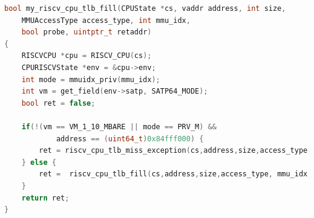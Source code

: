 \begin{lstlisting}[language=c,float=h!,basicstyle=\footnotesize,
    caption={Alternative Implementation for the RISC-V tlb\_fill function with a special case to
    start testing TLB miss Handler implementations.
    In line 11, a conditional branch is used to only trigger the exception when neither the
    Virtual Memory (as set in the \texttt{satp} \texttt{MODE} field) is bare nor the privilege
    mode is the machine mode.
    If the virtual address is the hardcoded one, a TLB miss exception is thrown, otherwise the
    original functions is called, which will perform a page table walk to find the mapping.},
    label={lst:specialCaseTLBfill}]
bool my_riscv_cpu_tlb_fill(CPUState *cs, vaddr address, int size,
    MMUAccessType access_type, int mmu_idx,
    bool probe, uintptr_t retaddr)
{
    RISCVCPU *cpu = RISCV_CPU(cs);
    CPURISCVState *env = &cpu->env;
    int mode = mmuidx_priv(mmu_idx);
    int vm = get_field(env->satp, SATP64_MODE);
    bool ret = false;

    if(!(vm == VM_1_10_MBARE || mode == PRV_M) &&
            address == (uint64_t)0x84fff000) {
        ret = riscv_cpu_tlb_miss_exception(cs,address,size,access_type, mmu_idx, probe, retaddr);
    } else {
        ret =  riscv_cpu_tlb_fill(cs,address,size,access_type, mmu_idx, probe, retaddr);
    }
    return ret;
}
\end{lstlisting}




